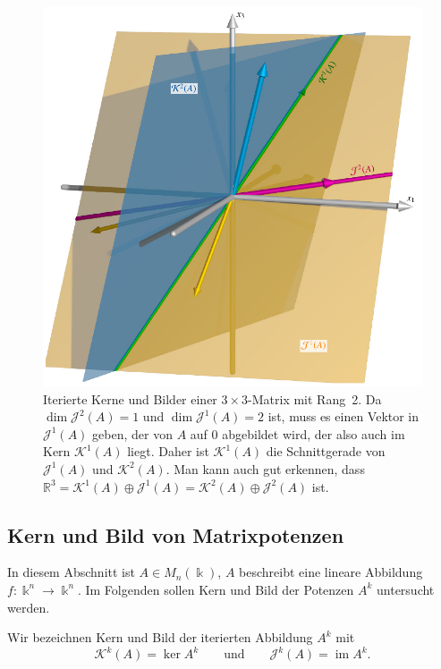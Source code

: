 \begin{figure}
\centering
\includegraphics[width=\textwidth]{chapters/40-eigenwerte/images/kombiniert.pdf}
\caption{Iterierte Kerne und Bilder einer $3\times 3$-Matrix mit Rang~2.
Da $\dim\mathcal{J}^2(A)=1$ und $\dim\mathcal{J}^1(A)=2$ ist, muss es
einen Vektor in $\mathcal{J}^1(A)$ geben, der von $A$ auf $0$ abgebildet
wird, der also auch im Kern $\mathcal{K}^1(A)$ liegt.
Daher ist $\mathcal{K}^1(A)$ die Schnittgerade von $\mathcal{J}^1(A)$ und
$\mathcal{K}^2(A)$.
Man kann auch gut erkennen, dass
$\mathbb{R}^3
=
\mathcal{K}^1(A)\oplus \mathcal{J}^1(A)
=
\mathcal{K}^2(A) \oplus \mathcal{J}^2(A)$
ist.
\label{buch:eigenwerte:img:kombiniert}}
\end{figure}

%
%
\subsection{Kern und Bild von Matrixpotenzen
\label{buch:subsection:kern-und-bild}}
In diesem Abschnitt ist $A\in M_n(\Bbbk)$, $A$ beschreibt eine lineare
Abbildung $f\colon\Bbbk^n\to \Bbbk^n$.
Im Folgenden sollen Kern und Bild der Potenzen $A^k$ untersucht werden.
\begin{definition}
Wir bezeichnen Kern und Bild der iterierten Abbildung $A^k$ mit
\[
\mathcal{K}^k(A)
=
\ker A^k
\qquad\text{und}\qquad
\mathcal{J}^k(A)
=
\operatorname{im} A^k.
\]
%
%
\end{definition}

